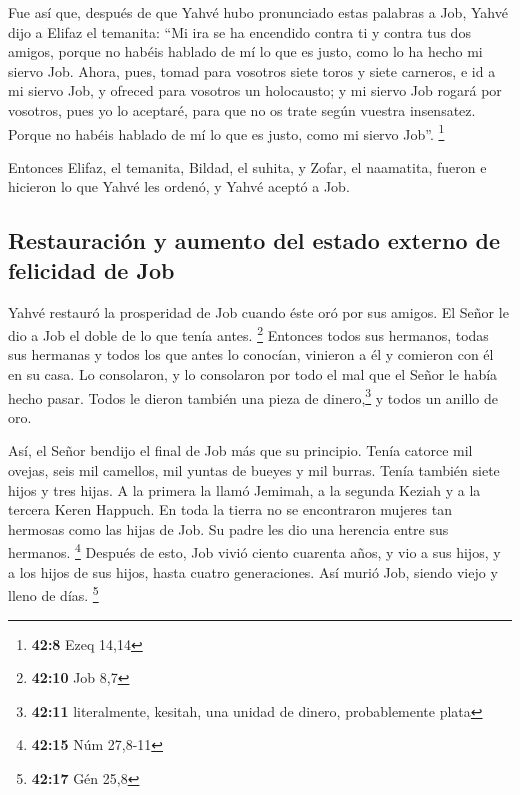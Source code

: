  Fue así que, después de que Yahvé hubo pronunciado estas
palabras a Job, Yahvé dijo a Elifaz el temanita: ``Mi ira se ha
encendido contra ti y contra tus dos amigos, porque no habéis hablado de
mí lo que es justo, como lo ha hecho mi siervo Job. 
Ahora, pues, tomad para vosotros siete toros y siete carneros, e id a mi
siervo Job, y ofreced para vosotros un holocausto; y mi siervo Job
rogará por vosotros, pues yo lo aceptaré, para que no os trate según
vuestra insensatez. Porque no habéis hablado de mí lo que es justo, como
mi siervo Job''. \footnote{\textbf{42:8} Ezeq 14,14}

 Entonces Elifaz, el temanita, Bildad, el suhita, y Zofar,
el naamatita, fueron e hicieron lo que Yahvé les ordenó, y Yahvé aceptó
a Job.

\hypertarget{restauraciuxf3n-y-aumento-del-estado-externo-de-felicidad-de-job}{%
\subsection{Restauración y aumento del estado externo de felicidad de
Job}\label{restauraciuxf3n-y-aumento-del-estado-externo-de-felicidad-de-job}}

 Yahvé restauró la prosperidad de Job cuando éste oró por
sus amigos. El Señor le dio a Job el doble de lo que tenía antes.
\footnote{\textbf{42:10} Job 8,7}  Entonces todos sus
hermanos, todas sus hermanas y todos los que antes lo conocían, vinieron
a él y comieron con él en su casa. Lo consolaron, y lo consolaron por
todo el mal que el Señor le había hecho pasar. Todos le dieron también
una pieza de dinero,\footnote{\textbf{42:11} literalmente, kesitah, una
  unidad de dinero, probablemente plata} y todos un anillo de oro.

 Así, el Señor bendijo el final de Job más que su
principio. Tenía catorce mil ovejas, seis mil camellos, mil yuntas de
bueyes y mil burras.  Tenía también siete hijos y tres
hijas.  A la primera la llamó Jemimah, a la segunda
Keziah y a la tercera Keren Happuch.  En toda la tierra
no se encontraron mujeres tan hermosas como las hijas de Job. Su padre
les dio una herencia entre sus hermanos. \footnote{\textbf{42:15} Núm
  27,8-11}  Después de esto, Job vivió ciento cuarenta
años, y vio a sus hijos, y a los hijos de sus hijos, hasta cuatro
generaciones.  Así murió Job, siendo viejo y lleno de
días. \footnote{\textbf{42:17} Gén 25,8}
